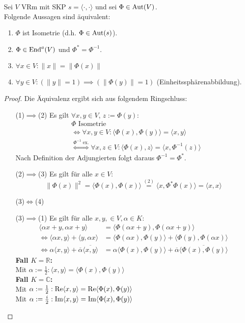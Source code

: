 \documentclass[parskip,a4paper,twoside,DIV15,BCOR12mm]{scrbook}
\begin{document}
\begin{theo}[Isometriekriterium]
Sei $V$ VRm mit SKP $s=\langle\cdot,\cdot\rangle$ und sei $\Phi\in\operatorname{Aut}(V)$.\\
Folgende Aussagen sind äquivalent:
\begin{enumerate}
\item $\Phi$ ist Isometrie (d.h. $\Phi\in\operatorname{Aut}(s)$).
\item $\Phi\in\operatorname{End}^a(V)$ und $\Phi^*=\Phi^{-1}$.
\item $\forall x\in V: \|x\|=\|\Phi(x)\|$
\item $\forall y\in V: (\|y\|=1)\implies(\|\Phi(y)\|=1)$ (Einheitssphärenabbildung).
\end{enumerate}
\end{theo}

\begin{proof}
Die Äquivalenz ergibt sich aus folgendem Ringschluss:
\begin{enumerate}
\item[(1)$\implies$(2)] Es gilt $\forall x,y\in V$, $z:=\Phi(y)$:
\begin{align*}
&\Phi \text{ Isometrie}\\
&\iff \forall x,y\in V:\langle\Phi(x),\Phi(y)\rangle =\langle x,y\rangle\\
&\stackrel{\Phi^{-1}\text{ ex.}}{\iff} \forall x,z\in V:\langle\Phi(x),z\rangle
=\langle x,\Phi^{-1}(z)\rangle
\end{align*}
Nach Definition der Adjungierten folgt daraus $\Phi^{-1} = \Phi^*$.
\item[(2)$\implies$(3)] Es gilt für alle $x\in V$:
\[\|\Phi(x)\|^2=\langle\Phi(x),\Phi(x)\rangle\stackrel{(2)}{=}
\langle x,\Phi^*\Phi(x)\rangle=\langle x,x\rangle\]
\item[(3)$\iff$(4)] \checkmark
\item[(3)$\implies$(1)] Es gilt für alle $x,y,\in V,\alpha\in K:$
\begin{align*}
\langle\alpha x+y,\alpha x+y\rangle &= \langle\Phi(\alpha x+y),\Phi(\alpha x+y)\rangle\\
\iff\langle \alpha x,y\rangle +\langle y,\alpha x\rangle &= \langle\Phi(\alpha x),
\Phi(y)\rangle + \langle\Phi(y),\Phi(\alpha x)\rangle\\
\iff\alpha\langle x,y\rangle +\overline{\alpha}\overline{\langle x,y\rangle} &=
\alpha\langle\Phi(x),\Phi(y)\rangle + \overline{\alpha}\overline{\langle\Phi(x),\Phi(y)\rangle}
\end{align*}
\textbf{Fall $K=\mathbb{R}$:}\\ 
Mit $\alpha:=\frac12:\langle x,y\rangle =\langle\Phi(x),\Phi(y)\rangle$\\
\textbf{Fall $K=\mathbb{C}$:}\\ 
Mit $\alpha:=\frac12:\operatorname{Re}\langle x,y\rangle =\operatorname{Re}\langle\Phi(x),\Phi(y)\rangle$\\
Mit $\alpha:=\frac i2:\operatorname{Im}\langle x,y\rangle =\operatorname{Im}\langle\Phi(x),\Phi(y)\rangle$
\end{enumerate}
\end{proof}
\end{document}
